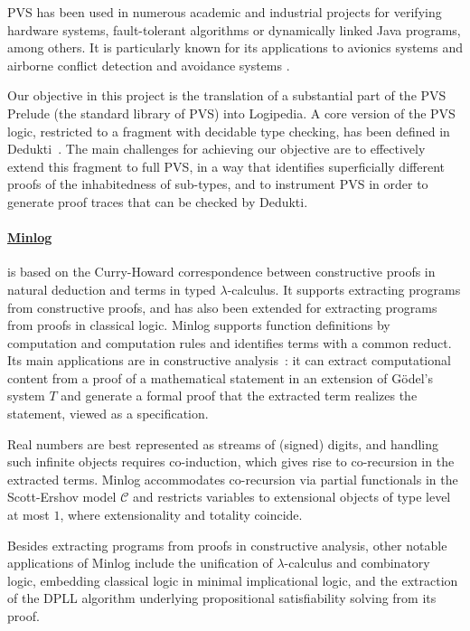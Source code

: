 PVS has been used in numerous academic and industrial projects for
verifying hardware systems, fault-tolerant algorithms or dynamically
linked Java programs, among others. It is particularly known for its
applications to avionics systems and airborne conflict detection and
avoidance systems \cite{munoz:unmanned}.

Our objective in this project is the translation of a substantial part
of the PVS Prelude (the standard library of PVS) into Logipedia. A
core version of the PVS logic, restricted to a fragment with decidable
type checking, has been defined in
Dedukti~\cite{gilbert:extending}. The main challenges for achieving
our objective are to effectively extend this fragment to full PVS, in
a way that identifies superficially different proofs of the
inhabitedness of sub-types, and to instrument PVS in
order to generate proof traces that can be checked by Dedukti.

\paragraph*{\href{http://www.mathematik.uni-muenchen.de/~logik/minlog/index.php}{Minlog}}
is based on the Curry-Howard correspondence between constructive proofs
in natural deduction and terms in typed $\lambda$-calculus. It supports
extracting programs from constructive proofs, and has also been extended for extracting
programs from proofs in classical logic. Minlog supports function definitions by
computation and computation rules and identifies terms with a common reduct. Its
main applications are in constructive analysis~\cite{miyamoto:real}: it can extract
computational content from a proof of a mathematical statement in an extension
of G\"odel's system $T$ and generate a formal proof that the extracted term
realizes the statement, viewed as a specification.

Real numbers are best represented as streams of (signed) digits, and handling
such infinite objects requires co-induction, which gives rise to co-recursion in
the extracted terms. Minlog accommodates co-recursion via partial functionals in
the Scott-Ershov model $\mathcal{C}$ and restricts variables to extensional
objects of type level at most $1$, where extensionality and totality coincide.

Besides extracting programs from proofs in constructive analysis, other notable
applications of Minlog include the unification of $\lambda$-calculus and
combinatory logic, embedding classical logic in minimal implicational logic, and
the extraction of the DPLL algorithm underlying propositional satisfiability
solving from its proof.

